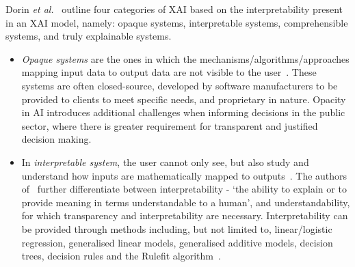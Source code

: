 Dorin {\em et al.}~\cite{doran17} outline four categories of XAI based
on the interpretability present in an XAI model, namely: opaque
systems, interpretable systems, comprehensible systems, and truly
explainable systems.

\begin{itemize}

\item \emph{Opaque systems} are the ones in which the mechanisms/algorithms/approaches mapping input data to output data are not visible to the user~\cite{doran17}. These systems are often closed-source, developed by software manufacturers to be provided to clients to meet specific needs, and proprietary in nature. Opacity in AI introduces additional challenges when informing decisions in the public sector, where there is greater requirement for transparent and justified decision making.


\item In \emph{interpretable system}, the user cannot only see, but also study and understand how inputs are mathematically mapped to outputs~\cite{doran17}. The authors of~\cite{BARREDOARRIETA202082} further differentiate between interpretability - `the ability to explain or to provide meaning in terms understandable to a human', and understandability, for which transparency and interpretability are necessary.
Interpretability can be provided through methods including, but not limited to, linear/logistic regression, generalised linear models, generalised additive models, decision trees, decision rules and the Rulefit algorithm~\cite{Molnar20}.


\end{itemize}
